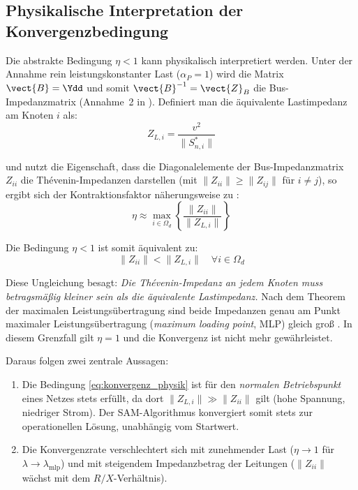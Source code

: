 \subsection{Physikalische Interpretation der Konvergenzbedingung}
\label{subsec:konvergenz_physik}

Die abstrakte Bedingung $\eta < 1$ kann physikalisch interpretiert werden. Unter der Annahme rein leistungskonstanter Last ($\alpha_P = 1$) wird die Matrix $\vect{B} = \Ydd$ und somit $\vect{B}^{-1} = \vect{Z}_B$ die Bus-Impedanzmatrix (Annahme~2 in \cite{Giraldo2022}). Definiert man die äquivalente Lastimpedanz am Knoten $i$ als:
\begin{equation}
	Z_{L,i} = \frac{v^2}{\|S_{n,i}^*\|}
	\label{eq:lastimpedanz}
\end{equation}

und nutzt die Eigenschaft, dass die Diagonalelemente der Bus-Impedanzmatrix $Z_{ii}$ die Thévenin-Impedanzen darstellen (mit $\|Z_{ii}\| \geq \|Z_{ij}\|$ für $i \neq j$), so ergibt sich der Kontraktionsfaktor näherungsweise zu \cite{Giraldo2022}:
\begin{equation}
	\eta \approx \max_{i \in \Omega_d} \left\{\frac{\|Z_{ii}\|}{\|Z_{L,i}\|}\right\}
	\label{eq:eta_physikalisch}
\end{equation}

Die Bedingung $\eta < 1$ ist somit äquivalent zu:
\begin{equation}
	\|Z_{ii}\| < \|Z_{L,i}\| \quad \forall i \in \Omega_d
	\label{eq:konvergenz_physik}
\end{equation}

Diese Ungleichung besagt: \textit{Die Thévenin-Impedanz an jedem Knoten muss betragsmäßig kleiner sein als die äquivalente Lastimpedanz.} Nach dem Theorem der maximalen Leistungsübertragung \cite{Grainger1994} sind beide Impedanzen genau am Punkt maximaler Leistungsübertragung (\textit{maximum loading point}, MLP) gleich groß \cite{Giraldo2022}. In diesem Grenzfall gilt $\eta = 1$ und die Konvergenz ist nicht mehr gewährleistet.

Daraus folgen zwei zentrale Aussagen:
\begin{enumerate}
	\item Die Bedingung \eqref{eq:konvergenz_physik} ist für den \textit{normalen Betriebspunkt} eines Netzes stets erfüllt, da dort $\|Z_{L,i}\| \gg \|Z_{ii}\|$ gilt (hohe Spannung, niedriger Strom). Der SAM-Algorithmus konvergiert somit stets zur operationellen Lösung, unabhängig vom Startwert.
	\item Die Konvergenzrate verschlechtert sich mit zunehmender Last ($\eta \to 1$ für $\lambda \to \lambda_{\text{mlp}}$) und mit steigendem Impedanzbetrag der Leitungen ($\|Z_{ii}\|$ wächst mit dem $R/X$-Verhältnis).
\end{enumerate}

